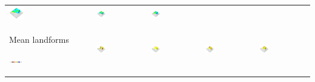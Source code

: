 \documentclass[Afour,sageh,times]{sagej}
\begin{document}
\begin{table}[h]
\begin{tabular}{m{} m{} m{} m{} m{}}
\includegraphics[width=0.18\textwidth]{images/render_3d/participants/mean_slope_1.png} &
\includegraphics[width=0.18\textwidth]{images/render_3d/participants/mean_slope_2.png} &
\includegraphics[width=0.18\textwidth]{images/render_3d/participants/mean_slope_3.png}\\
%
Mean landforms \par \vspace{0.5em} \includegraphics[width=0.16\textwidth]{images/legends/forms_legend.pdf} & 
\includegraphics[width=0.18\textwidth]{images/render_3d/participants/forms_1.png} &
\includegraphics[width=0.18\textwidth]{images/render_3d/participants/mean_forms_1.png} &
\includegraphics[width=0.18\textwidth]{images/render_3d/participants/mean_forms_2.png} &
\includegraphics[width=0.18\textwidth]{images/render_3d/participants/mean_forms_3.png}\\

\end{tabular}
\end{table}
\end{document}

